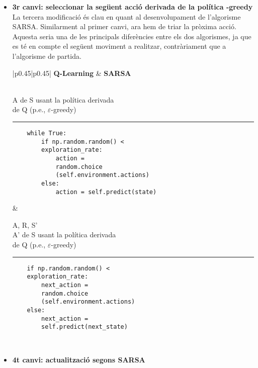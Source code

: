 \documentclass{article}
\begin{document}
\begin{itemize}
\newpage
    \item \textbf{3r canvi: seleccionar la següent acció derivada de la política \bm{$\varepsilon$}-greedy}\\
    La tercera modificació és clau en quant al desenvolupament de l'algorisme SARSA. Similarment al primer canvi, ara hem de triar la pròxima acció. Aquesta seria una de les principals diferències entre els dos algorismes, ja que es té en compte el següent moviment a realitzar, contràriament que a l'algorisme de partida.
    \begin{table}[h]
\begin{tabular}{|p{0.45\textwidth}|p{0.45\textwidth}|}
\hline
\textbf{Q-Learning} & \textbf{SARSA} \\
\hline
\begin{minipage}{\linewidth}
\begin{algorithmic}[H]
\STATE {} \\
\qquad {} A de S usant la política derivada\\
\qquad de Q (p.e., $\varepsilon$-greedy)
\end{algorithmic}
\noindent\rule{\linewidth}{0.4pt} 
\begin{verbatim}
    while True:
        if np.random.random() <
        exploration_rate:
            action =
            random.choice
            (self.environment.actions)
        else:
            action = self.predict(state)
\end{verbatim}
\end{minipage}
&
\begin{minipage}{\linewidth}
\begin{algorithmic}[H]
\STATE {} A,  R, S' \\
 A' de S usant la política derivada\\
de Q (p.e., $\varepsilon$-greedy)
\end{algorithmic}
\noindent\rule{\linewidth}{0.4pt} 
\begin{verbatim}
    if np.random.random() <
    exploration_rate:
        next_action =
        random.choice
        (self.environment.actions)
    else:
        next_action =
        self.predict(next_state)
\end{verbatim}
\end{minipage} \\
\hline
\end{tabular}
\end{table}
    \item \textbf{4t canvi: actualització segons SARSA}\\

\end{itemize}
\end{document}

